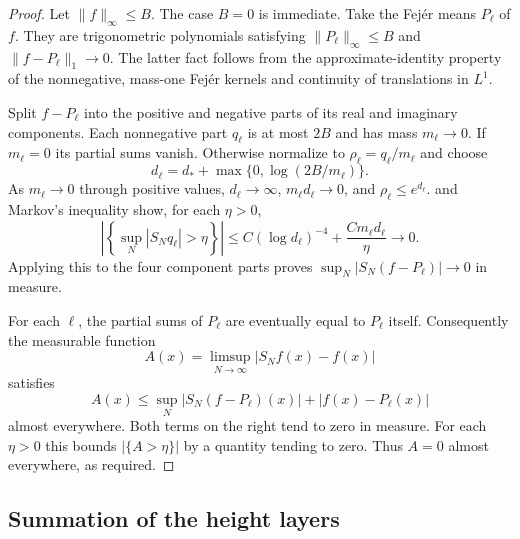 \begin{proof}
Let $\|f\|_\infty\le B$. The case $B=0$ is immediate.
Take the Fej\'er means $P_\ell$ of $f$. They are trigonometric
polynomials satisfying $\|P_\ell\|_\infty\le B$ and
$\|f-P_\ell\|_1\to0$. The latter fact follows from the approximate-identity
property of the nonnegative, mass-one Fej\'er kernels and continuity of
translations in $L^1$.

Split $f-P_\ell$ into the positive and negative parts of its real and
imaginary components. Each nonnegative part $q_\ell$ is at most $2B$
and has mass $m_\ell\to0$. If $m_\ell=0$ its partial sums vanish.
Otherwise normalize to $\rho_\ell=q_\ell/m_\ell$ and choose
\[
 d_\ell=d_*+\max\{0,\log(2B/m_\ell)\}.
\]
As $m_\ell\to0$ through positive values, $d_\ell\to\infty$,
$m_\ell d_\ell\to0$, and $\rho_\ell\le e^{d_\ell}$.
 and Markov's inequality show, for each $\eta>0$,
\[
 \left|\left\{\sup_N|S_Nq_\ell|>\eta\right\}\right|
 \le C(\log d_\ell)^{-4}
       +\frac{Cm_\ell d_\ell}{\eta}\longrightarrow0.
\]
Applying this to the four component parts proves
$\sup_N|S_N(f-P_\ell)|\to0$ in measure.

For each $\ell$, the partial sums of $P_\ell$ are eventually equal to
$P_\ell$ itself. Consequently the measurable function
\[
 A(x)=\limsup_{N\to\infty}|S_Nf(x)-f(x)|
\]
satisfies
\[
 A(x)\le \sup_N|S_N(f-P_\ell)(x)|+|f(x)-P_\ell(x)|
\]
almost everywhere. Both terms on the right tend to zero in measure.
For each $\eta>0$ this bounds $|\{A>\eta\}|$ by a quantity tending to
zero. Thus $A=0$ almost everywhere, as required.
\end{proof}

\subsection{Summation of the height layers}

